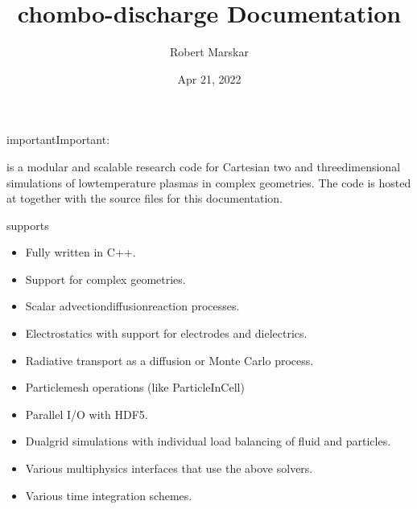 \documentclass[letterpaper,10pt,english]{sphinxmanual}
\title{chombo-discharge Documentation}
\date{Apr 21, 2022}
\author{Robert Marskar}
\begin{document}
\pagestyle{empty}
\sphinxmaketitle
\pagestyle{plain}
\sphinxtableofcontents
\pagestyle{normal}
\label{\detokenize{index::doc}}
\begin{sphinxadmonition}{important}{Important:}
\end{sphinxadmonition}



 is a modular and scalable research code for Cartesian two\sphinxhyphen{} and three\sphinxhyphen{}dimensional simulations of low\sphinxhyphen{}temperature plasmas in complex geometries.
The code is hosted at  together with the source files for this documentation.

 supports
\begin{itemize}
\item {} 
Fully written in C++.

\item {} 
Support for complex geometries.

\item {} 
Scalar advection\sphinxhyphen{}diffusion\sphinxhyphen{}reaction processes.

\item {} 
Electrostatics with support for electrodes and dielectrics.

\item {} 
Radiative transport as a diffusion or Monte Carlo process.

\item {} 
Particle\sphinxhyphen{}mesh operations (like Particle\sphinxhyphen{}In\sphinxhyphen{}Cell)

\item {} 
Parallel I/O with HDF5.

\item {} 
Dual\sphinxhyphen{}grid simulations with individual load balancing of fluid and particles.

\item {} 
Various multi\sphinxhyphen{}physics interfaces that use the above solvers.

\item {} 
Various time integration schemes.

\end{itemize}
\end{document}
